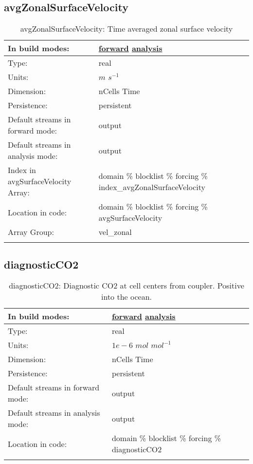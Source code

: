 \subsection[avgZonalSurfaceVelocity]{avgZonalSurfaceVelocity}
\label{subsec:var_sec_forcing_avgZonalSurfaceVelocity}
\begin{center}
\begin{longtable}{| p{2.0in} | p{4.0in} |}
        \hline 
        In build modes: & \hyperref[subsec:forward_var_tab_forcing]{forward} \hyperref[subsec:analysis_var_tab_forcing]{analysis} \\
        \hline 
        Type: & real \\
        \hline 
        Units: & $m$ $s^{-1}$ \\
        \hline 
        Dimension: & nCells Time \\
        \hline 
        Persistence: & persistent \\
        \hline 
		 Default streams in forward mode: &  output \\
        \hline 
		 Default streams in analysis mode: &  output \\
        \hline 
		 Index in avgSurfaceVelocity Array: & domain \% blocklist \% forcing \% index\_avgZonalSurfaceVelocity \\
		 \hline 
		 Location in code: & domain \% blocklist \% forcing \% avgSurfaceVelocity \\
		 \hline 
		 Array Group: & vel\_zonal \\
		 \hline 
    \caption{avgZonalSurfaceVelocity: Time averaged zonal surface velocity}
\end{longtable}
\end{center}
\subsection[diagnosticCO2]{diagnosticCO2}
\label{subsec:var_sec_forcing_diagnosticCO2}
\begin{center}
\begin{longtable}{| p{2.0in} | p{4.0in} |}
        \hline 
        In build modes: & \hyperref[subsec:forward_var_tab_forcing]{forward} \hyperref[subsec:analysis_var_tab_forcing]{analysis} \\
        \hline 
        Type: & real \\
        \hline 
        Units: & $1e-6$ $mol$ $mol^{-1}$ \\
        \hline 
        Dimension: & nCells Time \\
        \hline 
        Persistence: & persistent \\
        \hline 
		 Default streams in forward mode: &  output \\
        \hline 
		 Default streams in analysis mode: &  output \\
        \hline 
		 Location in code: & domain \% blocklist \% forcing \% diagnosticCO2 \\
		 \hline 
    \caption{diagnosticCO2: Diagnostic CO2 at cell centers from coupler. Positive into the ocean.}
\end{longtable}
\end{center}
